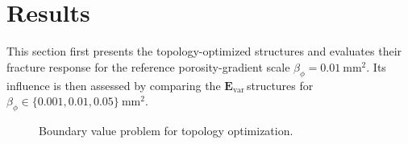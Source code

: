\documentclass[
	pdflatex,
	sn-mathphys-num
]{sn-jnl}
\newcommand{\Evar}{\ensuremath{\mathbf{E}_{\text{var}}}{\,}}
\theoremstyle{thmstyleone}%
\theoremstyle{thmstyletwo}%
\theoremstyle{thmstylethree}%
\begin{document}
\section{Results}\label{sec_results}
This section first presents the topology-optimized structures
and evaluates their fracture response for the reference
porosity-gradient scale $\beta_{\phi}=0.01~\mathrm{mm^2}$. Its influence is then assessed by comparing the
\Evar structures for
$\beta_{\phi}\in\{0.001,0.01,0.05\}~\mathrm{mm^2}$.
\begin{figure}[htbp]
	\centering

	\resizebox{0.5\textwidth}{!}{%
		
	}
	\caption{Boundary value problem for topology optimization.}
	\label{fig:dcb_setup}
\end{figure}




\end{document}
